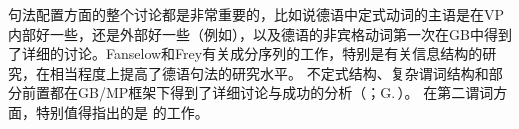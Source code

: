 句法配置方面的整个讨论都是非常重要的，比如说德语中定式动词的主语是在VP内部好一些，还是外部好一些（例如\citealp*{Haider82,Grewendorf83a,Kratzer84a,Kratzer96a,Webelhuth85a,%
Sternefeld85b,%
Scherpenisse86a,%
Fanselow87a,Grewendorf88a,Duerscheid89a,Webelhuth90,%
Oppenrieder91a,%
Wilder91a,Haider93a,Grewendorf93,%
Frey93a,%
Lenerz94a,%
Meinunger2000a%
}），以及德语的非宾格动词第一次在GB中得到了详细的讨论\citep{Grewendorf89a,Fanselow92}。Fanselow和Frey有关成分序列的工作，特别是有关信息结构的研究，在相当程度上提高了德语句法的研究水平\citep{Fanselow88,Fanselow90,Fanselow93a,Fanselow2000a,Fanselow2001a,Fanselow2003d,Fanselow2003a,Fanselow2004a,Frey2000a-u,Frey2001a,Frey2004a,Frey2005a}。
不定式结构、复杂谓词结构和部分前置都在GB/MP框架下得到了详细讨论与成功的分析（\citealp{Bierwisch63,Evers75a,Haider82,Haider86c,Haider90b,Haider91,Haider93a,Grewendorf83a,Grewendorf87a,Grewendorf88a,denBesten85b,Sternefeld85b,Fanselow87a,Fanselow2002a,SS88a,BK89a}；G.\,\citealp{GMueller96a,GMueller98a,VS98a}）。
在第二谓词方面，特别值得指出的是 \citet{Winkler97a}的工作。

